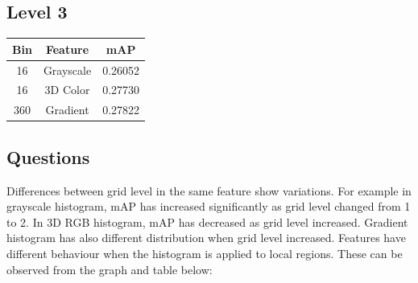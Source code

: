 \documentclass[12pt]{article}
\begin{document}
\subsection{Level 3}
\begin{minipage}{\textwidth}
	\begin{minipage}{0.49\textwidth}
		\centering
		\captionsetup{width=.9\textwidth}
	 \end{minipage}
	 \hfill
	\begin{minipage}{0.49\textwidth}
		\centering
		\begin{tabular}{ | c | c | c | }
		  	\hline			
		  	\bf Bin & \bf Feature & \bf mAP \\
		  	\hline			
		  	16 & Grayscale & 0.26052 \\
		  	\hline			
		  	16 & 3D Color & 0.27730 \\
		  	\hline			
		  	360 & Gradient & 0.27822 \\
		  	\hline
		\end{tabular}
		\captionsetup{width=.8\textwidth}
	\end{minipage}
\end{minipage}

\subsection{Questions}
\qquad Differences between grid level in the same feature show variations. For example in grayscale histogram, mAP has increased significantly as grid level changed from 1 to 2. In 3D RGB histogram, mAP has decreased as grid level increased. Gradient histogram has also different distribution when grid level increased. Features have different behaviour when the histogram is applied to local regions. These can be observed from the graph and table below: \\
\end{document}
